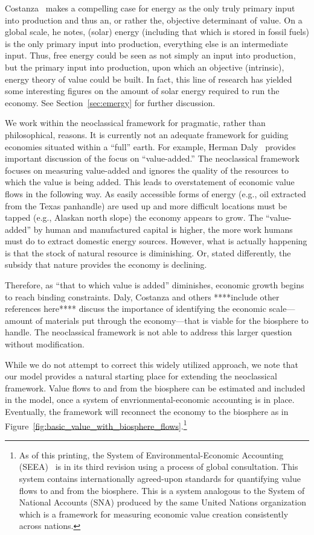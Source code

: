 Costanza~\cite{Costanza:2004we} makes a compelling case for energy 
as the only truly primary input into production 
and thus an, or rather the, objective determinant of value. 
On a global scale, he notes, (solar) energy 
(including that which is stored in fossil fuels) is the only primary input into production, 
everything else is an intermediate input. 
Thus, free energy could be seen as not simply an input into production, 
but the primary input into production, upon which an objective (intrinsic), 
energy theory of value could be built. 
In fact, this line of research has yielded some interesting figures on the amount 
of solar energy required to run the economy. 
See Section~\ref{sec:emergy} for further discussion.

We work within the neoclassical framework for pragmatic, rather than philosophical, reasons. 
It is currently not an adequate 
framework for guiding economies situated within a ``full'' earth. For example, 
Herman Daly~\cite{daly1995} provides important discussion 
of the focus on ``value-added.'' %
The neoclassical framework focuses on measuring value-added 
and ignores the quality of the resources to which the value is being added. 
This leads to overstatement of economic value flows in the following way. 
As easily accessible forms of energy (e.g.,  oil extracted from the Texas panhandle) 
are used up and more difficult locations must be tapped (e.g., Alaskan north slope) 
the economy appears to grow.
The ``value-added'' by human and manufactured capital is higher, 
the more work humans must do to extract domestic energy sources. 
However, what is actually happening is that the stock  of  natural resource is diminishing. 
Or, stated differently, the subsidy that nature provides the economy is declining.

Therefore, as ``that to which value is added'' diminishes, 
economic growth begins to reach binding constraints.
Daly, Costanza and others ****include other references here**** discuss the importance of 
identifying the economic scale---amount of materials put through the economy---that 
is viable for the biosphere to handle. 
The neoclassical framework is not able to address this larger question without modification.

While we do not attempt to correct this widely utilized approach, 
we note that our model provides a natural starting place for extending the neoclassical framework. 
Value flows to and from the biosphere can be estimated and included in the model, 
once a system of envrionmental-economic accounting is in place. 
Eventually, the framework will reconnect the economy to the biosphere 
as in Figure~\ref{fig:basic_value_with_biosphere_flows}.\footnote{As of this printing, 
the System of Environmental-Economic Accounting (SEEA)~\cite{UNSEEA:aa}
is in its third revision 
using a process of global consultation. 
This system contains internationally agreed-upon standards for quantifying value flows 
to and from the biosphere. 
This is a system analogous to the System of National Accounts (SNA) 
produced by the same United Nations organization
which is a framework for measuring economic value creation consistently across nations.}

